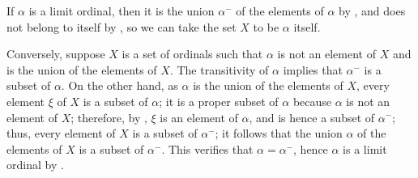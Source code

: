 \documentclass{article}
\begin{document}
\begin{solution}[\ref{exe:vj15laqs}]
  \label{sol:dxac7ayu}
  If \(\alpha\) is a limit ordinal, then it is the union \(\alpha^-\)
  of the elements of \(\alpha\) by , and does not
  belong to itself by , so we can take the set
  \(X\) to be \(\alpha\) itself.

  Conversely, suppose \(X\) is a set of ordinals such that \(\alpha\)
  is not an element of \(X\) and is the union of the elements of
  \(X\).  The transitivity of \(\alpha\) implies that \(\alpha^-\) is
  a subset of \(\alpha\).  On the other hand, as \(\alpha\) is the
  union of the elements of \(X\), every element \(\xi\) of \(X\) is a
  subset of \(\alpha\); it is a proper subset of \(\alpha\) because
  \(\alpha\) is not an element of \(X\); therefore, by
  , \(\xi\) is an element of \(\alpha\), and is
  hence a subset of \(\alpha^-\); thus, every element of \(X\) is a
  subset of \(\alpha^-\); it follows that the union \(\alpha\) of the
  elements of \(X\) is a subset of \(\alpha^-\).  This verifies that
  \(\alpha = \alpha^-\), hence \(\alpha\) is a limit ordinal by
  .
\end{solution}
\end{document}
